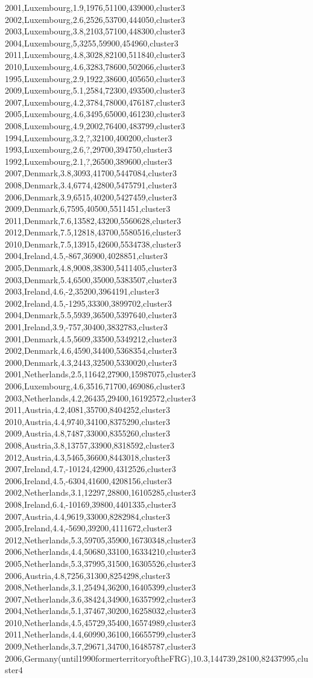 2001,Luxembourg,1.9,1976,51100,439000,cluster3
2002,Luxembourg,2.6,2526,53700,444050,cluster3
2003,Luxembourg,3.8,2103,57100,448300,cluster3
2004,Luxembourg,5,3255,59900,454960,cluster3
2011,Luxembourg,4.8,3028,82100,511840,cluster3
2010,Luxembourg,4.6,3283,78600,502066,cluster3
1995,Luxembourg,2.9,1922,38600,405650,cluster3
2009,Luxembourg,5.1,2584,72300,493500,cluster3
2007,Luxembourg,4.2,3784,78000,476187,cluster3
2005,Luxembourg,4.6,3495,65000,461230,cluster3
2008,Luxembourg,4.9,2002,76400,483799,cluster3
1994,Luxembourg,3.2,?,32100,400200,cluster3
1993,Luxembourg,2.6,?,29700,394750,cluster3
1992,Luxembourg,2.1,?,26500,389600,cluster3
2007,Denmark,3.8,3093,41700,5447084,cluster3
2008,Denmark,3.4,6774,42800,5475791,cluster3
2006,Denmark,3.9,6515,40200,5427459,cluster3
2009,Denmark,6,7595,40500,5511451,cluster3
2011,Denmark,7.6,13582,43200,5560628,cluster3
2012,Denmark,7.5,12818,43700,5580516,cluster3
2010,Denmark,7.5,13915,42600,5534738,cluster3
2004,Ireland,4.5,-867,36900,4028851,cluster3
2005,Denmark,4.8,9008,38300,5411405,cluster3
2003,Denmark,5.4,6500,35000,5383507,cluster3
2003,Ireland,4.6,-2,35200,3964191,cluster3
2002,Ireland,4.5,-1295,33300,3899702,cluster3
2004,Denmark,5.5,5939,36500,5397640,cluster3
2001,Ireland,3.9,-757,30400,3832783,cluster3
2001,Denmark,4.5,5609,33500,5349212,cluster3
2002,Denmark,4.6,4590,34400,5368354,cluster3
2000,Denmark,4.3,2443,32500,5330020,cluster3
2001,Netherlands,2.5,11642,27900,15987075,cluster3
2006,Luxembourg,4.6,3516,71700,469086,cluster3
2003,Netherlands,4.2,26435,29400,16192572,cluster3
2011,Austria,4.2,4081,35700,8404252,cluster3
2010,Austria,4.4,9740,34100,8375290,cluster3
2009,Austria,4.8,7487,33000,8355260,cluster3
2008,Austria,3.8,13757,33900,8318592,cluster3
2012,Austria,4.3,5465,36600,8443018,cluster3
2007,Ireland,4.7,-10124,42900,4312526,cluster3
2006,Ireland,4.5,-6304,41600,4208156,cluster3
2002,Netherlands,3.1,12297,28800,16105285,cluster3
2008,Ireland,6.4,-10169,39800,4401335,cluster3
2007,Austria,4.4,9619,33000,8282984,cluster3
2005,Ireland,4.4,-5690,39200,4111672,cluster3
2012,Netherlands,5.3,59705,35900,16730348,cluster3
2006,Netherlands,4.4,50680,33100,16334210,cluster3
2005,Netherlands,5.3,37995,31500,16305526,cluster3
2006,Austria,4.8,7256,31300,8254298,cluster3
2008,Netherlands,3.1,25494,36200,16405399,cluster3
2007,Netherlands,3.6,38424,34900,16357992,cluster3
2004,Netherlands,5.1,37467,30200,16258032,cluster3
2010,Netherlands,4.5,45729,35400,16574989,cluster3
2011,Netherlands,4.4,60990,36100,16655799,cluster3
2009,Netherlands,3.7,29671,34700,16485787,cluster3
2006,Germany(until1990formerterritoryoftheFRG),10.3,144739,28100,82437995,cluster4
